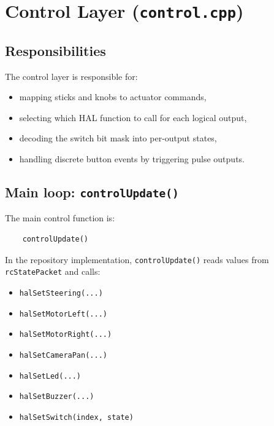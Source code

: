 \section{Control Layer (\texttt{control.cpp})}
\label{sec:control-hal-control-layer}

\subsection{Responsibilities}
\label{subsec:control-hal-control-resp}

The control layer is responsible for:

\begin{itemize}
    \item mapping sticks and knobs to actuator commands,
    \item selecting which HAL function to call for each logical output,
    \item decoding the switch bit mask into per-output states,
    \item handling discrete button events by triggering pulse outputs.
\end{itemize}

\subsection{Main loop: \texttt{controlUpdate()}}
\label{subsec:control-hal-controlUpdate}

The main control function is:

\begin{verbatim}
    controlUpdate()
\end{verbatim}

In the repository implementation, \texttt{controlUpdate()} reads values from \texttt{rcStatePacket} and calls:

\begin{itemize}
    \item \texttt{halSetSteering(...)}
    \item \texttt{halSetMotorLeft(...)}
    \item \texttt{halSetMotorRight(...)}
    \item \texttt{halSetCameraPan(...)}
    \item \texttt{halSetLed(...)}
    \item \texttt{halSetBuzzer(...)}
    \item \texttt{halSetSwitch(index, state)}
\end{itemize}

